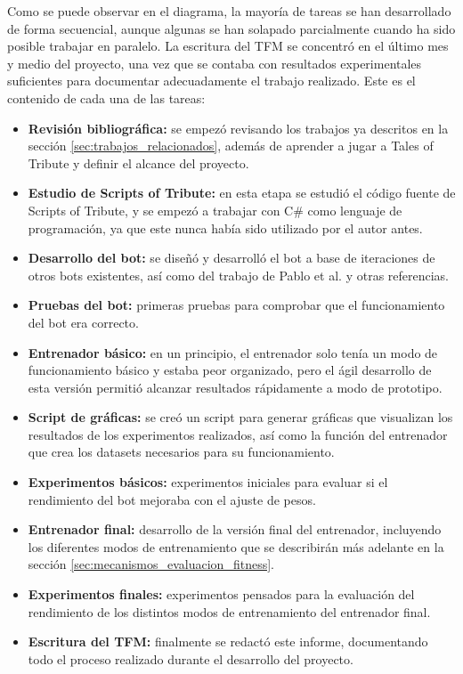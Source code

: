Como se puede observar en el diagrama, la mayoría de tareas se han desarrollado de forma secuencial, aunque algunas se han solapado parcialmente cuando ha sido posible trabajar en paralelo. La escritura del TFM se concentró en el último mes y medio del proyecto, una vez que se contaba con resultados experimentales suficientes para documentar adecuadamente el trabajo realizado. Este es el contenido de cada una de las tareas:
\begin{itemize}
	\item \textbf{Revisión bibliográfica:} se empezó revisando los trabajos ya descritos en la sección \ref{sec:trabajos_relacionados}, además de aprender a jugar a Tales of Tribute y definir el alcance del proyecto.
	\item \textbf{Estudio de Scripts of Tribute:} en esta etapa se estudió el código fuente de Scripts of Tribute, y se empezó a trabajar con C\# como lenguaje de programación, ya que este nunca había sido utilizado por el autor antes.
	\item \textbf{Desarrollo del bot:} se diseñó y desarrolló el bot a base de iteraciones de otros bots existentes, así como del trabajo de Pablo et al.  y otras referencias.
	\item \textbf{Pruebas del bot:} primeras pruebas para comprobar que el funcionamiento del bot era correcto.
	\item \textbf{Entrenador básico:} en un principio, el entrenador solo tenía un modo de funcionamiento básico y estaba peor organizado, pero el ágil desarrollo de esta versión permitió alcanzar resultados rápidamente a modo de prototipo.
	\item \textbf{Script de gráficas:} se creó un script para generar gráficas que visualizan los resultados de los experimentos realizados, así como la función del entrenador que crea los datasets necesarios para su funcionamiento.
	\item \textbf{Experimentos básicos:} experimentos iniciales para evaluar si el rendimiento del bot mejoraba con el ajuste de pesos.
	\item \textbf{Entrenador final:} desarrollo de la versión final del entrenador, incluyendo los diferentes modos de entrenamiento que se describirán más adelante en la sección \ref{sec:mecanismos_evaluacion_fitness}. 
	\item \textbf{Experimentos finales:} experimentos pensados para la evaluación del rendimiento de los distintos modos de entrenamiento del entrenador final.
	\item \textbf{Escritura del TFM:} finalmente se redactó este informe, documentando todo el proceso realizado durante el desarrollo del proyecto.
\end{itemize}